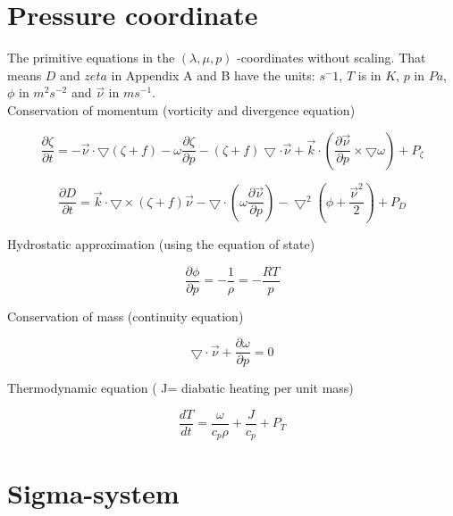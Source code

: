 \section{Pressure coordinate}

The primitive equations in the $(\lambda , \mu, p)$ -coordinates
without scaling. That means $D$ and $zeta$ in Appendix A and B have
the units: $s^-1$, $T$ is in $K$, $p$ in $Pa$,  $\phi$ in $m^2 s^{-2}$
and $\vec{\nu}$ in $m s^{-1}$.\\


Conservation of momentum (vorticity and divergence equation)

\begin{equation}
{\displaystyle \frac{\partial \zeta}{\partial t} = - \vec{\nu} \cdot \bigtriangledown (\zeta + f) - \omega \frac{\partial \zeta}{\partial p} - (\zeta + f) \bigtriangledown \cdot \vec{\nu} + \vec{k} \cdot (\frac{\partial \vec{\nu}}{\partial p} \times \bigtriangledown \omega) + P_\zeta} 
\end{equation}       

\begin{equation}
{\displaystyle \frac{\partial D}{\partial t} = \vec{k} \cdot \bigtriangledown \times (\zeta + f) \vec{\nu} - \bigtriangledown \cdot (\omega \frac{\partial \vec{\nu}}{\partial p}) - \bigtriangledown^2 (\phi + \frac{\vec{\nu}^2}{2}) + P_D} \end{equation}  

Hydrostatic approximation (using the equation of state)

\begin{equation}
{\displaystyle \frac{\partial \phi}{\partial p} = - \frac{1}{\rho} = - \frac{RT}{p}}     
\end{equation}     

Conservation of mass (continuity equation)

\begin{equation}
{\displaystyle \bigtriangledown \cdot \vec{\nu} + \frac{ \partial \omega}{\partial p} = 0}     
\end{equation} 

Thermodynamic equation ( J= diabatic heating per unit mass)

\begin{equation}
{\displaystyle \frac{d T}{d t} = \frac{\omega}{c_p \rho} + \frac{J}{c_p} + P_T}
\end{equation} 
    

\section{Sigma-system}

